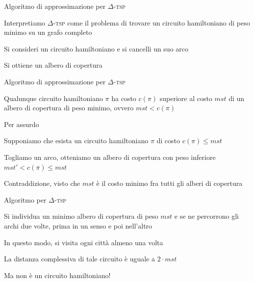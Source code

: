 \begin{frame}{Algoritmo di approssimazione per $\Delta$-\textsc{tsp}}

\vspace{-9pt}
\BIL
\item Interpretiamo $\Delta$-\textsc{tsp} come il problema di trovare
un circuito hamiltoniano di peso minimo su un grafo completo
\item Si consideri un circuito hamiltoniano e si cancelli un suo arco
\item Si ottiene un albero di copertura
\EIL

\medskip
{}

\end{frame}

\begin{frame}{Algoritmo di approssimazione per $\Delta$-\textsc{tsp}}

\vspace{-9pt}
\begin{myboxtitle}[Teorema]
Qualunque circuito hamiltoniano $\pi$ ha costo $c(\pi)$ superiore al costo $\mathit{mst}$ di un albero di copertura di peso minimo, ovvero $\mathit{mst} < c(\pi)$
\end{myboxtitle}    

\begin{myboxtitle}[Dimostrazione]
Per assurdo
\BIL 
\item Supponiamo che esista un circuito hamiltoniano $\pi$ di costo $c(\pi) \leq \mathit{mst}$
\item Togliamo un arco, otteniamo un albero di copertura con peso inferiore
$\mathit{mst}' < c(\pi) \leq \mathit{mst}$
\item Contraddizione, visto che $\mathit{mst}$ è il costo minimo fra tutti gli alberi di copertura 
\EIL
\end{myboxtitle}

\end{frame}

\begin{frame}{Algoritmo per $\Delta$-\textsc{tsp}}

\vspace{-9pt}
\BIL
\item Si individua un minimo albero di copertura di peso $\mathit{mst}$ e se ne percorrono gli archi due volte, prima in un senso e poi nell'altro 
\item In questo modo, si visita ogni città almeno una volta
\item La distanza complessiva di tale circuito è uguale a $2 \cdot \mathit{mst}$
\item Ma non è un circuito hamiltoniano!
\EIL

\vspace{-12pt}

\end{frame}

